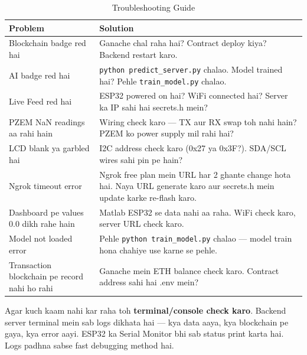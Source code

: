 \begin{table}[H]
\centering
\begin{tabularx}{\textwidth}{X X}
\toprule
\textbf{Problem} & \textbf{Solution} \\
\midrule
Blockchain badge red hai & Ganache chal raha hai? Contract deploy kiya? Backend restart karo. \\
AI badge red hai & \texttt{python predict\_server.py} chalao. Model trained hai? Pehle \texttt{train\_model.py} chalao. \\
Live Feed red hai & ESP32 powered on hai? WiFi connected hai? Server ka IP sahi hai secrets.h mein? \\
PZEM NaN readings aa rahi hain & Wiring check karo --- TX aur RX swap toh nahi hain? PZEM ko power supply mil rahi hai? \\
LCD blank ya garbled hai & I2C address check karo (0x27 ya 0x3F?). SDA/SCL wires sahi pin pe hain? \\
Ngrok timeout error & Ngrok free plan mein URL har 2 ghante change hota hai. Naya URL generate karo aur secrets.h mein update karke re-flash karo. \\
Dashboard pe values 0.0 dikh rahe hain & Matlab ESP32 se data nahi aa raha. WiFi check karo, server URL check karo. \\
Model not loaded error & Pehle \texttt{python train\_model.py} chalao --- model train hona chahiye use karne se pehle. \\
Transaction blockchain pe record nahi ho rahi & Ganache mein ETH balance check karo. Contract address sahi hai .env mein? \\
\bottomrule
\end{tabularx}
\caption{Troubleshooting Guide}
\end{table}

\begin{tipbox}
Agar kuch kaam nahi kar raha toh \textbf{terminal/console check karo}. Backend server terminal mein sab logs dikhata hai --- kya data aaya, kya blockchain pe gaya, kya error aayi. ESP32 ka Serial Monitor bhi sab status print karta hai. Logs padhna sabse fast debugging method hai.
\end{tipbox}
